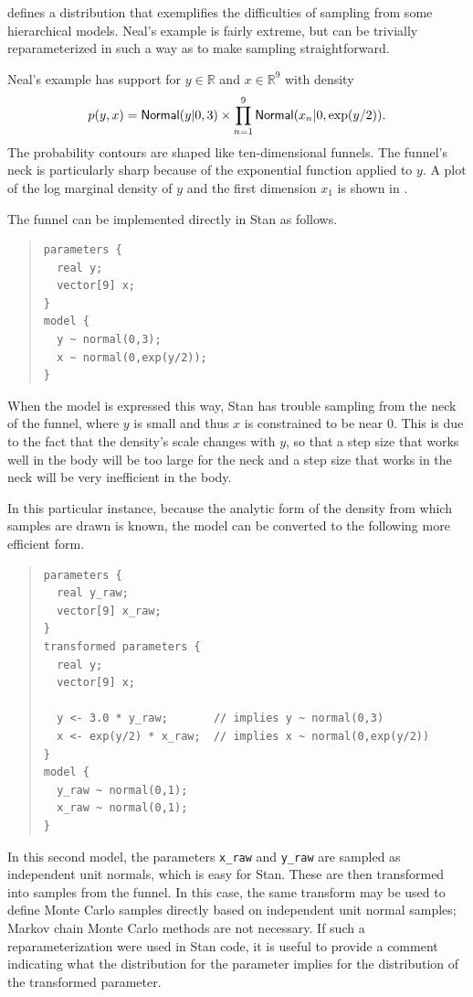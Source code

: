 \citep{Neal:2003} defines a distribution that exemplifies the
difficulties of sampling from some hierarchical models.  Neal's
example is fairly extreme, but can be trivially reparameterized in
such a way as to make sampling straightforward.

Neal's example has support for $y \in
\mathbb{R}$ and  $x \in \mathbb{R}^9$ with density
%
\[
p(y,x) = \mbox{\sf Normal}(y|0,3) \times \prod_{n=1}^9
\mbox{\sf Normal}(x_n|0,\exp(y/2)).
\]
%
The probability contours are shaped like ten-dimensional funnels.  The
funnel's neck is particularly sharp because of the exponential
function applied to $y$.  A plot of the log marginal density of $y$
and the first dimension $x_1$ is shown in .

The funnel can be implemented directly in Stan as follows.
%
\begin{quote}
\begin{Verbatim}
parameters {  
  real y;
  vector[9] x;
}
model {
  y ~ normal(0,3);
  x ~ normal(0,exp(y/2));
}
\end{Verbatim}
\end{quote}
%
When the model is expressed this way, Stan has trouble sampling from
the neck of the funnel, where $y$ is small and thus $x$ is constrained
to be near 0.  This is due to the fact that the density's scale
changes with $y$, so that a step size that works well in the body will
be too large for the neck and a step size that works in the neck will be
very inefficient in the body.

In this particular instance, because the analytic form of the density
from which samples are drawn is known, the model can be converted to
the following more efficient form.
%
\begin{quote}
\begin{Verbatim}
parameters {  
  real y_raw;
  vector[9] x_raw;
}
transformed parameters {
  real y;
  vector[9] x;

  y <- 3.0 * y_raw;       // implies y ~ normal(0,3)
  x <- exp(y/2) * x_raw;  // implies x ~ normal(0,exp(y/2))
}
model {
  y_raw ~ normal(0,1);  
  x_raw ~ normal(0,1);  
}
\end{Verbatim}
\end{quote}
%
In this second model, the parameters \Verb|x_raw| and \Verb|y_raw| are
sampled as independent unit normals, which is easy for Stan.  These
are then transformed into samples from the funnel.  In this case, the
same transform may be used to define Monte Carlo samples directly
based on independent unit normal samples; Markov chain Monte Carlo
methods are not necessary. If such a reparameterization were used in
Stan code, it is useful to provide a comment indicating what the
distribution for the parameter implies for the distribution of the
transformed parameter.

